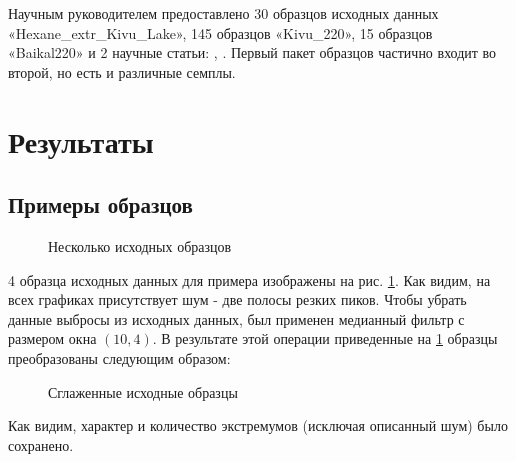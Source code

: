 \documentclass[a4paper]{article}
\begin{document}
Научным руководителем предоставлено 30 образцов исходных данных \\«Hexane_extr_Kivu_Lake», 145 образцов «Kivu_220», 15 образцов «Baikal220» и 2 научные статьи: \cite{article1}, \cite{article2}. Первый пакет образцов частично входит во второй, но есть и различные семплы.
\section{Результаты}
\subsection{Примеры образцов}
\begin{figure}[H]
    \centering
    
    
    
    
    \caption{Несколько исходных образцов}
    \label{fig:samples}
\end{figure}
4 образца исходных данных для примера изображены на рис. \ref{fig:samples}. Как видим, на всех графиках присутствует шум - две полосы резких пиков. Чтобы убрать данные выбросы из исходных данных, был применен медианный фильтр с размером окна $(10, 4)$. В результате этой операции приведенные на \ref{fig:samples} образцы преобразованы следующим образом:
\begin{figure}[H]
    \centering
    
    
    
    
    \caption{Сглаженные исходные образцы}
    \label{fig:samples_filtered}
\end{figure}
Как видим, характер и количество экстремумов (исключая описанный шум) было сохранено.
\end{document}
